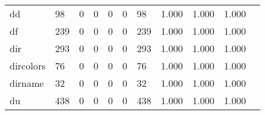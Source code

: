 \begin{longtable}{lp{1.2cm}p{1.2cm}p{1.2cm}p{1.2cm}p{1.2cm}p{1.2cm}p{1.2cm}p{1.2cm}p{1.2cm}p{1.2cm}}
dd        &                                    98 &                                                  0 &                                                  0 &                                                  0 &                                                  0 &                                                 98 &                                         1.000 &                                              1.000 &                                              1.000 \\
df        &                                   239 &                                                  0 &                                                  0 &                                                  0 &                                                  0 &                                                239 &                                         1.000 &                                              1.000 &                                              1.000 \\
dir       &                                   293 &                                                  0 &                                                  0 &                                                  0 &                                                  0 &                                                293 &                                         1.000 &                                              1.000 &                                              1.000 \\
dircolors &                                    76 &                                                  0 &                                                  0 &                                                  0 &                                                  0 &                                                 76 &                                         1.000 &                                              1.000 &                                              1.000 \\
dirname   &                                    32 &                                                  0 &                                                  0 &                                                  0 &                                                  0 &                                                 32 &                                         1.000 &                                              1.000 &                                              1.000 \\
du        &                                   438 &                                                  0 &                                                  0 &                                                  0 &                                                  0 &                                                438 &                                         1.000 &                                              1.000 &                                              1.000 \\

\end{longtable}

